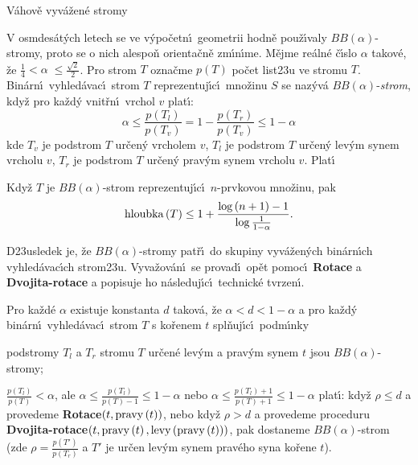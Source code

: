 \heading
V\'ahov\v e vyv\'a\v zen\'e stromy
\endheading

\flushpar V osmdes\'at\'ych letech se ve v\'ypo\v cetn\'\i\ geometrii 
hodn\v e pou\v z\'\i\-va\-ly $BB\left(\alpha \right)$-stromy, proto se o nich alespo\v n 
orienta\v cn\v e zm\'\i n\'\i me. M\v ejme re\'aln\'e \v c\'\i slo $
\alpha$ takov\'e, \v ze 
$\frac 14<\alpha\;\le\frac {\sqrt 2}2$. Pro strom $T$ ozna\v cme $
p\left(T\right)$ po\v cet 
list\accent23u ve stromu $T$. Bin\'arn\'\i\ vyhled\'avac\'\i\ strom $T$ 
reprezentuj\'\i c\'\i\ mno\v zinu $S$ se naz\'yv\'a $BB\left(\alpha \right)$-\emph{strom}, 
kdy\v z pro ka\v zd\'y vnit\v rn\'\i\ vrchol $v$ plat\'\i :
$$\alpha\le\frac {p\left(T_l\right)}{p \left(T_v\right)}=1-\frac {p\left(T_r\right)}{p\left(T_v\right)}\le 1-\alpha$$
kde $T_v$ je podstrom $T$ ur\v cen\'y vrcholem $v$, $T_l$ je podstrom 
$T$ ur\v cen\'y lev\'ym synem vrcholu $v$, $T_r$ je podstrom $T$ 
ur\v cen\'y prav\'ym synem vrcholu $v$. Plat\'\i


Kdy\v z $T$ je $BB\left(\alpha \right)$-strom reprezentuj\'\i c\'\i\ 
$n$-prvkovou mno\v zinu, pak 
$$\operatorname{hloubka}\left(T\right)\le 1+\frac {\log\left(n+1\right)-1}{\log\frac 1{1-\alpha}}.$$
\endproclaim

\flushpar D\accent23usledek je, \v ze $BB\left(\alpha \right)$-stromy pat\v r\'\i\ do 
skupiny vyv\'a\v zen\'ych bin\'arn\'\i ch vyhled\'avac\'\i ch 
stro\-m\accent23u.  Vyva\v zov\'an\'\i\ se provad\'\i\ op\v et pomoc\'\i\ 
{\bf Rotace} a {\bf Dvojita-rotace} a popisuje ho n\'asledu\-j\'\i\-c\'\i\ 
technick\'e tvrzen\'\i. 

\proclaim{Tvrzen\'\i}Pro ka\v zd\'e $\alpha$ existuje konstanta $
d$ 
takov\'a, \v ze $\alpha <d<1-\alpha$ a pro ka\v zd\'y bin\'arn\'\i\ vyhled\'avac\'\i\ 
strom $T$ s ko\v renem $t$ spl\v nuj\'\i c\'\i\ podm\'\i nky
\roster
\item
podstromy $T_l$ a $T_r$ stromu $T$ ur\v cen\'e lev\'ym a prav\'ym 
synem $t$ jsou $BB\left(\alpha \right)$-stromy;
\item
$\frac {p\left(T_l\right)}{p\left(T\right)}<\alpha$, ale $\alpha\le\frac {
p\left(T_l\right)}{p\left(T\right)-1}\le 1-\alpha$ nebo $\alpha\le\frac {
p\left(T_l\right)+1}{p\left(T\right)+1}\le 1-\alpha$
\endroster
plat\'\i :\newline 
kdy\v z $\rho\le d$ a provedeme {\bf Rotace$\left(t,\operatorname{pravy}\left(t\right)\right)$}, nebo kdy\v z 
$\rho >d$ a provedeme proceduru {\bf Dvojita-rotace$\left(t,\operatorname{pravy}\left(t\right),\operatorname{levy}\left(\operatorname{pravy}\left(t\right)\right)\right)$}, pak dostaneme 
$BB\left(\alpha \right)$-strom (zde $\rho =\frac {p\left(T'\right)}{p\left(T_r
\right)}$ a $T'$ je ur\v cen lev\'ym synem 
prav\'e\-ho syna ko\v rene $t$).  
\endproclaim

